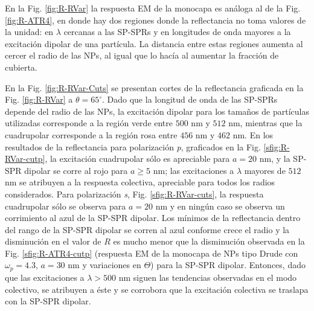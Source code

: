 En la Fig.   \ref{fig:R-RVar} la respuesta EM de la monocapa es análoga al de la Fig. \ref{fig:R-ATR4}, en donde hay dos regiones donde la reflectancia no toma valores de la unidad: en $\lambda$ cercanas a las SP-SPRs y en longitudes de onda mayores a la excitación dipolar de una partícula. La distancia entre estas regiones aumenta al cercer el radio de las NPs, al igual que lo hacía al aumentar la fracción de cubierta.

En la Fig. \ref{fig:R-RVar-Cuts} se presentan cortes de la reflectancia graficada en la Fig. \ref{fig:R-RVar} a $\theta = 65^\circ$. Dado que la longitud de onda de las SP-SPRs depende del radio de las NPs, la excitación dipolar para los tamaños de partículas utilizadas corresponde a la región verde entre $500$ nm y $512$ nm, mientras que la cuadrupolar corresponde a la región rosa entre $456$ nm y $462$ nm.
 En los resultados de la reflectancia para polarización \emph{p}, graficados en la Fig. \ref{sfig:R-RVar-cutp}, la excitación cuadrupolar sólo es apreciable para $a=20$ nm, y la SP-SPR dipolar se corre al rojo para $a\geq 5$ nm; las excitaciones a $\lambda$ mayores de $512$ nm se atribuyen a la respuesta colectiva, apreciable para todos los radios considerados. Para polarización \emph{s}, Fig. \ref{sfig:R-RVar-cuts}, la respuesta cuadrupolar sólo se observa para $a = 20$ nm y en ningún caso se observa un corrimiento al azul de la SP-SPR dipolar. Los mínimos de la reflectancia dentro del rango de la SP-SPR dipolar se corren al azul conforme crece el radio y la disminución en el valor de $R$ es mucho menor que la disminución  observada en la Fig. \ref{sfig:R-ATR4-cutp} (respuesta EM de la monocapa de NPs tipo Drude con $\omega_p = 4.3$, $a = 30$ nm y variaciones en $\Theta$) para la SP-SPR dipolar. Entonces, dado que las excitaciones a $\lambda>500$ nm siguen las tendencias observadas en el modo colectivo, se atribuyen a éste y se corrobora que la excitación colectiva se traslapa con la SP-SPR dipolar.

